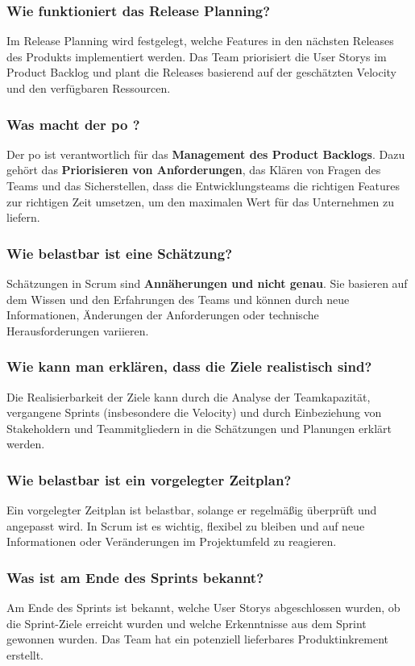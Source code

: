 \documentclass[main.tex]{subfiles}
\begin{document}
\subsubsection*{Wie funktioniert das Release Planning?} 
Im Release Planning wird festgelegt, welche Features in den nächsten Releases des Produkts implementiert werden. Das Team priorisiert die \glspl{User Story} im \gls{Product Backlog} und plant die Releases basierend auf der geschätzten \gls{Velocity} und den verfügbaren Ressourcen.

\subsubsection*{Was macht der \gls{po} ?}
Der \gls{po} ist verantwortlich für das \textbf{Management des \gls{Product Backlog}s}. Dazu gehört das \textbf{Priorisieren von Anforderungen}, das Klären von Fragen des Teams und das Sicherstellen, dass die Entwicklungsteams die richtigen Features zur richtigen Zeit umsetzen, um den maximalen Wert für das Unternehmen zu liefern.

\subsubsection*{Wie belastbar ist eine Schätzung?}
Schätzungen in Scrum sind \textbf{Annäherungen und nicht genau}. Sie basieren auf dem Wissen und den Erfahrungen des Teams und können durch neue Informationen, Änderungen der Anforderungen oder technische Herausforderungen variieren.

\subsubsection*{Wie kann man erklären, dass die Ziele realistisch sind?}
Die Realisierbarkeit der Ziele kann durch die Analyse der Teamkapazität, vergangene \glspl{Sprint} (insbesondere die \gls{Velocity}) und durch Einbeziehung von Stakeholdern und Teammitgliedern in die Schätzungen und Planungen erklärt werden.

\subsubsection*{Wie belastbar ist ein vorgelegter Zeitplan?}
Ein vorgelegter Zeitplan ist belastbar, solange er regelmäßig überprüft und angepasst wird. In Scrum ist es wichtig, flexibel zu bleiben und auf neue Informationen oder Veränderungen im Projektumfeld zu reagieren.

\subsubsection*{Was ist am Ende des \glspl{Sprint} bekannt?}
Am Ende des \glspl{Sprint} ist bekannt, welche \glspl{User Story} abgeschlossen wurden, ob die \gls{Sprint}-Ziele erreicht wurden und welche Erkenntnisse aus dem \gls{Sprint} gewonnen wurden. Das Team hat ein potenziell lieferbares Produktinkrement erstellt.
 
\end{document}
